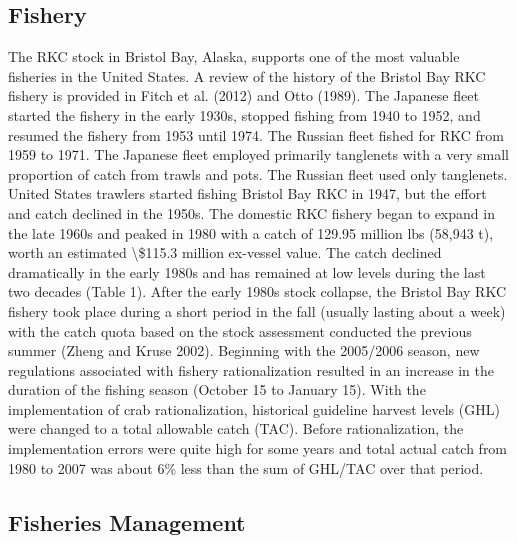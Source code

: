 \documentclass[]{article}
\begin{document}
\subsection{Fishery}\label{fishery}

The RKC stock in Bristol Bay, Alaska, supports one of the most valuable
fisheries in the United States. A review of the history of the Bristol
Bay RKC fishery is provided in Fitch et al. (2012) and Otto (1989). The
Japanese fleet started the fishery in the early 1930s, stopped fishing
from 1940 to 1952, and resumed the fishery from 1953 until 1974. The
Russian fleet fished for RKC from 1959 to 1971. The Japanese fleet
employed primarily tanglenets with a very small proportion of catch from
trawls and pots. The Russian fleet used only tanglenets. United States
trawlers started fishing Bristol Bay RKC in 1947, but the effort and
catch declined in the 1950s. The domestic RKC fishery began to expand in
the late 1960s and peaked in 1980 with a catch of 129.95 million lbs
(58,943 t), worth an estimated \textbackslash{}\$115.3 million ex-vessel
value. The catch declined dramatically in the early 1980s and has
remained at low levels during the last two decades (Table 1). After the
early 1980s stock collapse, the Bristol Bay RKC fishery took place
during a short period in the fall (usually lasting about a week) with
the catch quota based on the stock assessment conducted the previous
summer (Zheng and Kruse 2002). Beginning with the 2005/2006 season, new
regulations associated with fishery rationalization resulted in an
increase in the duration of the fishing season (October 15 to January
15). With the implementation of crab rationalization, historical
guideline harvest levels (GHL) were changed to a total allowable catch
(TAC). Before rationalization, the implementation errors were quite high
for some years and total actual catch from 1980 to 2007 was about 6\%
less than the sum of GHL/TAC over that period.

\subsection{Fisheries Management}\label{fisheries-management}
\end{document}
